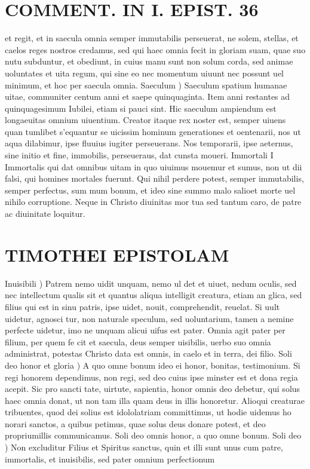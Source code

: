\documentclass{article}
\begin{document}
\begin{pages}
\section*{COMMENT. IN I. EPIST. 36 }
\marginpar{[ p.36 ]}\pstart et regit, et in saecula omnia semper immutabilis perseuerat, ne solem, stellas, et caelos reges nostros credamus, sed qui haec omnia fecit in gloriam suam, quae suo nutu subduntur, et obediunt, in cuius manu sunt non solum corda, sed animae uoluntates et uita regum, qui sine eo nec momentum uiuunt nec possunt uel minimum, et hoc per saecula omnia.  \pend\pstart Saeculum ) Saeculum spatium humanae uitae, communiter centum anni et saepe quinquaginta. Item anni restantes ad quinquagesimum Iubilei, etiam si pauci sint. Hic saeculum ampiendum est longaeuitas omnium uiuentium.  \pend\pstart Creator itaque rex noster est, semper uiuens quan tumlibet s’equantur se uicissim hominum generationes et oentenarii, nos ut aqua dilabimur, ipse fluuius iugiter perseuerans. Nos temporarii, ipse aeternus, sine initio et fine, immobilis, perseueraus, dat cunsta moueri.  \pend\pstart Immortali I Immortalis qui dat omnibus uitam in quo uiuimus mouemur et sumus, non ut dii falsi, qui homines mortales fuerunt. Qui nihil perdere potest, semper immutabilis, semper perfectus, sum mum bonum, et ideo sine summo malo salioet morte uel nihilo corruptione. Neque in Christo diuinitas mor tua sed tantum caro, de patre ac diuinitate loquitur.  \pend
\section*{TIMOTHEI EPISTOLAM }
\marginpar{[ p.37 ]}\pstart Inuisibili ) Patrem nemo uidit unquam, nemo ul det et uiuet, nedum oculis, sed nec intellectum qualis sit et quantus aliqua intelligit creatura, etiam an glica, sed filius qui est in sinu patris, ipse uidet, nouit, comprehendit, reuelat. Si uult uidetur, agnosci tur, non naturale speculum, sed uoluntarium, tamen a nemine perfecte uidetur, imo ne unquam alicui uifus est pater. Omnia agit pater per filium, per quem fe cit et saecula, deus semper uisibilis, uerbo suo omnia administrat, potestas Christo data est omnis, in caelo et in terra, dei filio.  \pend\pstart Soli deo honor et gloria ) A quo omne bonum ideo ei honor, bonitas, testimonium. Si regi honorem dependimus, non regi, sed deo cuius ipse minster est et dona regia acepit. Sic pro sancti tate, uirtute, sapientia, honor omnis deo debetur, qui solus haec omnia donat, ut non tam illa quam deus in illis honoretur. Alioqui creaturae tribuentes, quod dei solius est idololatriam committimus, ut hodie uidemus ho norari sanctos, a quibus petimus, quae solus deus donare potest, et deo propriumillis communicamus. Soli deo omnis honor, a quo omne bonum.  \pend\pstart Soli deo ) Non excluditur Filius et Spiritus sanctus, quin et illi sunt unus cum patre, immortalis, et inuisibilis, sed pater omnium perfectionum  \pend

\end{pages}
\end{document}
